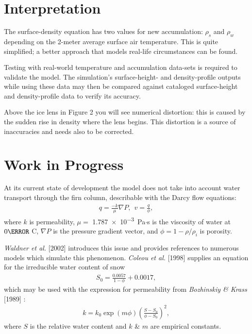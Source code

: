 \documentclass{article}%
\begin{document}
\section{Interpretation}

The surface-density equation has two values for new accumulation: $\rho_s$ and $\rho_w$ depending on the 2-meter average surface air temperature.  This is quite simplified; a better approach that models real-life circumstances can be found.  

Testing with real-world temperature and accumulation data-sets is required to validate the model.  The simulation's surface-height- and density-profile outputs while using these data may then be compared against cataloged surface-height and density-profile data to verify its accuracy.

Above the ice lens in Figure 2 you will see numerical distortion: this is caused by the sudden rise in density where the lens begins.  This distortion is a source of inaccuracies and needs also to be corrected.

\section{Work in Progress}
At its current state of development the model does not take into account water transport through the firn column, describable with the Darcy flow equations:
\begin{align*}
    q = \frac{-k}{\mu}\nabla P, \ \  v = \frac{q}{\phi},
\end{align*}
where $k$ is permeability, $\mu =$ \SI{1.787e-3} Pa$\cdot$s is the viscosity of water at $0\degree$ C, $\nabla P$ is the pressure gradient vector, and $\phi = 1- \rho/\rho_i$ is porosity.

\emph{Waldner et al.} [2002] introduces this issue and provides references to numerous models which simulate this phenomenon.  \emph{Coleou et al.} [1998] supplies an equation for the irreducible water content of snow
\begin{align*}
    S_0 = \frac{0.0057}{1 - \phi} + 0.0017,
\end{align*}
which may be used with the expression for permeability from \emph{Bozhinskiy \& Krass} [1989] :
\begin{align*}
    k = k_0 \exp(m \phi)\left( \frac{S - S_0}{\phi - S_0} \right)^2,
\end{align*}
where $S$ is the relative water content and $k$ \& $m$ are empirical constants.
\end{document}
